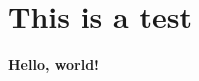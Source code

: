 \documentclass[../main.tex]{subfiles}
\begin{document}
\chapter{This is a test}
    
\textbf{Hello, world!}
\end{document}
